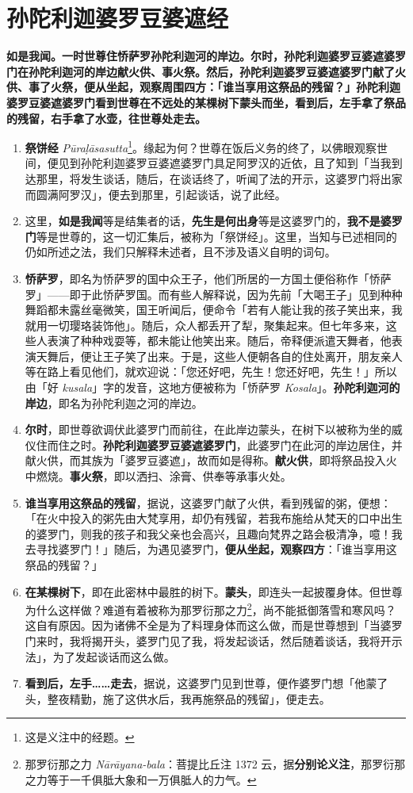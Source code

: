\section{孙陀利迦婆罗豆婆遮经}

\textbf{如是我闻。一时世尊住㤭萨罗孙陀利迦河的岸边。尔时，孙陀利迦婆罗豆婆遮婆罗门在孙陀利迦河的岸边献火供、事火祭。然后，孙陀利迦婆罗豆婆遮婆罗门献了火供、事了火祭，便从坐起，观察周围四方：「谁当享用这祭品的残留？」孙陀利迦婆罗豆婆遮婆罗门看到世尊在不远处的某棵树下蒙头而坐，看到后，左手拿了祭品的残留，右手拿了水壶，往世尊处走去。}

\begin{enumerate}\item \textbf{祭饼经} \textit{Pūraḷāsasutta}\footnote{这是义注中的经题。}。缘起为何？世尊在饭后义务的终了，以佛眼观察世间，便见到孙陀利迦婆罗豆婆遮婆罗门具足阿罗汉的近依，且了知到「当我到达那里，将发生谈话，随后，在谈话终了，听闻了法的开示，这婆罗门将出家而圆满阿罗汉」，便去到那里，引起谈话，说了此经。
\item 这里，\textbf{如是我闻}等是结集者的话，\textbf{先生是何出身}等是这婆罗门的，\textbf{我不是婆罗门}等是世尊的，这一切汇集后，被称为「祭饼经」。这里，当知与已述相同的仍如所述之法，我们只解释未述者，且不涉及语义自明的词句。
\item \textbf{㤭萨罗}，即名为㤭萨罗的国中众王子，他们所居的一方国土便俗称作「㤭萨罗」——即于此㤭萨罗国。而有些人解释说，因为先前「大喝王子」见到种种舞蹈都未露丝毫微笑，国王听闻后，便命令「若有人能让我的孩子笑出来，我就用一切璎珞装饰他」。随后，众人都丢开了犁，聚集起来。但七年多来，这些人表演了种种戏耍等，都未能让他笑出来。随后，帝释便派遣天舞者，他表演天舞后，便让王子笑了出来。于是，这些人便朝各自的住处离开，朋友亲人等在路上看见他们，就欢迎说：「您还好吧，先生！您还好吧，先生！」所以由「好 \textit{kusala}」字的发音，这地方便被称为「㤭萨罗 \textit{Kosala}」。\textbf{孙陀利迦河的岸边}，即名为孙陀利迦之河的岸边。
\item \textbf{尔时}，即世尊欲调伏此婆罗门而前往，在此岸边蒙头，在树下以被称为坐的威仪住而住之时。\textbf{孙陀利迦婆罗豆婆遮婆罗门}，此婆罗门在此河的岸边居住，并献火供，而其族为「婆罗豆婆遮」，故而如是得称。\textbf{献火供}，即将祭品投入火中燃烧。\textbf{事火祭}，即以洒扫、涂膏、供奉等承事火处。
\item \textbf{谁当享用这祭品的残留}，据说，这婆罗门献了火供，看到残留的粥，便想：「在火中投入的粥先由大梵享用，却仍有残留，若我布施给从梵天的口中出生的婆罗门，则我的孩子和我父亲也会高兴，且趣向梵界之路会极清净，噫！我去寻找婆罗门！」随后，为遇见婆罗门，\textbf{便从坐起，观察四方}：「谁当享用这祭品的残留？」
\item \textbf{在某棵树下}，即在此密林中最胜的树下。\textbf{蒙头}，即连头一起披覆身体。但世尊为什么这样做？难道有着被称为那罗衍那之力\footnote{那罗衍那之力 \textit{Nārāyana-bala}：菩提比丘注 1372 云，据\textbf{分别论义注}，那罗衍那之力等于一千俱胝大象和一万俱胝人的力气。}，尚不能抵御落雪和寒风吗？这自有原因。因为诸佛不全是为了料理身体而这么做，而是世尊想到「当婆罗门来时，我将揭开头，婆罗门见了我，将发起谈话，然后随着谈话，我将开示法」，为了发起谈话而这么做。
\item \textbf{看到后，左手……走去}，据说，这婆罗门见到世尊，便作婆罗门想「他蒙了头，整夜精勤，施了这供水后，我再施祭品的残留」，便走去。\end{enumerate}

